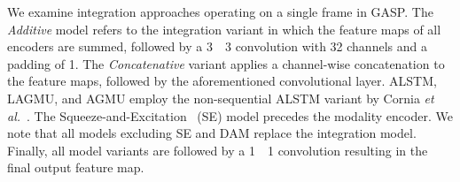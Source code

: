 \documentclass{article}
\begin{document}
\begin{table}[H]
\centering
\caption{Static integration results. Top rows represent non-fusion methods and bottom rows are fusion-based integration approaches.}
\label{tab:feedforward_res}
\end{table}

We examine integration approaches operating on a single frame in GASP. The \textit{Additive} model refers to the integration variant in which the feature maps of all encoders are summed, followed by a 3~~3 convolution with 32 channels and a padding of 1. The \textit{Concatenative} variant applies a channel-wise concatenation to the feature maps, followed by the aforementioned convolutional layer. ALSTM, LAGMU, and AGMU employ the non-sequential ALSTM variant by Cornia \textit{et al.}~. The Squeeze-and-Excitation~\cite{hu2018squeeze} (SE) model precedes the modality encoder. We note that all models excluding SE and DAM replace the integration model. Finally, all model variants are followed by a 1~~1 convolution resulting in the final output feature map.
\end{document}
